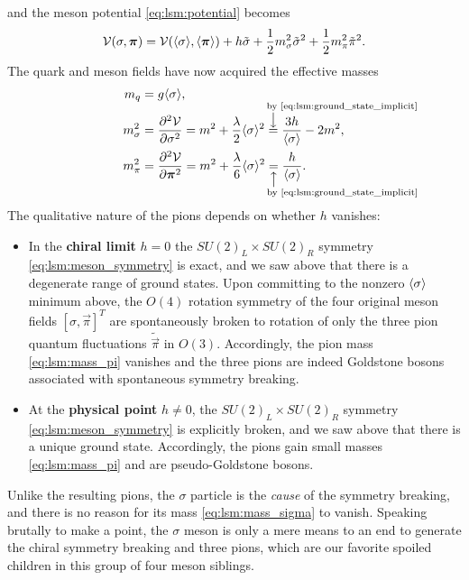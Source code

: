 and the meson potential \eqref{eq:lsm:potential} becomes
\begin{equation}
	\mathcal{V}(\sigma,{\bm{\pi}}) = \mathcal{V}(\langle \sigma \rangle,\langle {\bm{\pi}} \rangle) + h \tilde{\sigma} + \frac12 m_\sigma^2 \tilde{\sigma}^2 + \frac12 m_\pi^2 \tilde{\pi}^2.
\end{equation}
The quark and meson fields have now acquired the effective masses
\begin{subequations}
\begin{align}
	m_q &= g \avg{\sigma}, \label{eq:lsm:mass_quark} \\
	m_\sigma^2 &= \pdv[2]{\pot}{\sigma}\iffalse_{\substack{\sigma=\avg{\sigma}\\\vec{\pi}=\avg{\vec{\pi}}}}\fi    = m^2 + \frac{\lambda}{2} \avg{\sigma}^2 \equalexplabove{\smash[t]{\text{ by \eqref{eq:lsm:ground_state_implicit}}}} \frac{3h}{\avg{\sigma}} - 2 m^2 , \label{eq:lsm:mass_sigma} \\
	m_\pi^2    &= \pdv[2]{\pot}{\vec{\pi}}\iffalse_{\substack{\sigma=\avg{\sigma}\\\vec{\pi}=\avg{\vec{\pi}}}}\fi = m^2 + \frac{\lambda}{6} \avg{\sigma}^2 \equalexplbelow{\text{ by \eqref{eq:lsm:ground_state_implicit}}} \frac{h}{\avg{\sigma}} . \label{eq:lsm:mass_pi}
\end{align}%
\label{eq:lsm:mass_sigmapi}%
\end{subequations}%
The qualitative nature of the pions depends on whether $h$ vanishes:
\begin{itemize}
\item In the \textbf{chiral limit} $h = 0$ the $SU(2)_L \times SU(2)_R$ symmetry \eqref{eq:lsm:meson_symmetry} is exact,
      and we saw above that there is a degenerate range of ground states.
      Upon committing to the nonzero $\langle \sigma \rangle$ minimum above, the $O(4)$ rotation symmetry of the four original meson fields $[\sigma,\vec\pi]^T$ are spontaneously broken
      to rotation of only the three pion quantum fluctuations $\tilde{\vec\pi}$ in $O(3)$.
      Accordingly, the pion mass \eqref{eq:lsm:mass_pi} vanishes and the three pions are indeed Goldstone bosons associated with spontaneous symmetry breaking.
\item At the \textbf{physical point} $h \neq 0$, the $SU(2)_L \times SU(2)_R$ symmetry \eqref{eq:lsm:meson_symmetry} is explicitly broken,
      and we saw above that there is a unique ground state.
      Accordingly, the pions gain small masses \eqref{eq:lsm:mass_pi} and are pseudo-Goldstone bosons.
\end{itemize}
\label{elaborate on mexican hat analogy, brim, tip/tilt, etc.}
Unlike the resulting pions, the $\sigma$ particle is the \emph{cause} of the symmetry breaking,
and there is no reason for its mass \eqref{eq:lsm:mass_sigma} to vanish.
Speaking brutally to make a point, the $\sigma$ meson is only a mere means to an end to generate the chiral symmetry breaking and three pions,
which are our favorite spoiled children in this group of four meson siblings.

